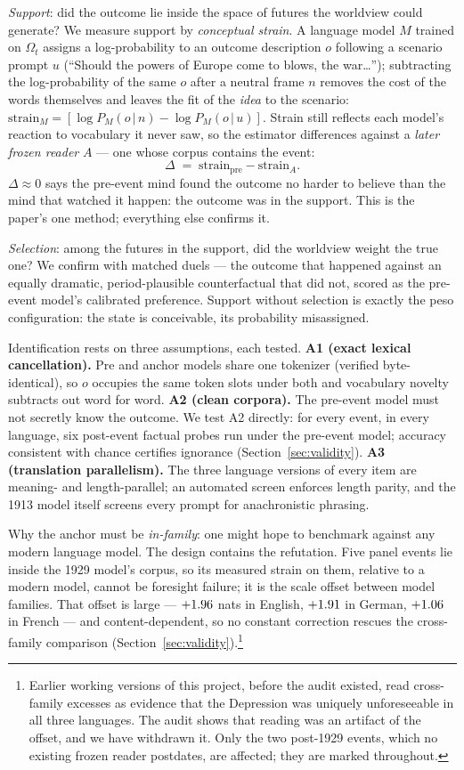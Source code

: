 \documentclass[11pt]{article}
\begin{document}
\emph{Support}: did the outcome lie inside the space of futures the worldview could generate? We measure
support by \emph{conceptual strain}. A language model $M$ trained on $\Omega_t$ assigns a log-probability to
an outcome description $o$ following a scenario prompt $u$ (``Should the powers of Europe come to blows, the
war\ldots''); subtracting the log-probability of the same $o$ after a neutral frame $n$ removes the cost of
the words themselves and leaves the fit of the \emph{idea} to the scenario:
$\mathrm{strain}_M = [\log P_M(o\,|\,n) - \log P_M(o\,|\,u)]$. Strain still reflects each model's reaction to
vocabulary it never saw, so the estimator differences against a \emph{later frozen reader} $A$ --- one whose
corpus contains the event:
\[
\Delta \;=\; \mathrm{strain}_{\text{pre}} - \mathrm{strain}_{A}.
\]
$\Delta\approx 0$ says the pre-event mind found the outcome no harder to believe than the mind that watched it
happen: the outcome was in the support. This is the paper's one method; everything else confirms it.

\emph{Selection}: among the futures in the support, did the worldview weight the true one? We confirm with
matched duels --- the outcome that happened against an equally dramatic, period-plausible counterfactual that
did not, scored as the pre-event model's calibrated preference. Support without selection is exactly the peso
configuration: the state is conceivable, its probability misassigned.

Identification rests on three assumptions, each tested. \textbf{A1 (exact lexical cancellation).} Pre and
anchor models share one tokenizer (verified byte-identical), so $o$ occupies the same token slots under both
and vocabulary novelty subtracts out word for word. \textbf{A2 (clean corpora).} The pre-event model must not
secretly know the outcome. We test A2 directly: for every event, in every language, six post-event factual
probes run under the pre-event model; accuracy consistent with chance certifies ignorance
(Section~\ref{sec:validity}). \textbf{A3 (translation parallelism).} The three language versions of every
item are meaning- and length-parallel; an automated screen enforces length parity, and the 1913 model itself
screens every prompt for anachronistic phrasing.

Why the anchor must be \emph{in-family}: one might hope to benchmark against any modern language model. The
design contains the refutation. Five panel events lie inside the 1929 model's corpus, so its measured strain
on them, relative to a modern model, cannot be foresight failure; it is the scale offset between model
families. That offset is large --- $+1.96$ nats in English, $+1.91$ in German, $+1.06$
in French --- and content-dependent, so no constant correction rescues the cross-family comparison
(Section~\ref{sec:validity}).\footnote{Earlier working versions of this project, before the audit existed,
read cross-family excesses as evidence that the Depression was uniquely unforeseeable in all three languages.
The audit shows that reading was an artifact of the offset, and we have withdrawn it. Only the two post-1929
events, which no existing frozen reader postdates, are affected; they are marked throughout.}
\end{document}
